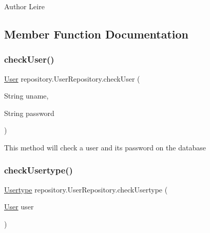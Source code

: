 \begin{DoxyAuthor}{Author}
Leire 
\end{DoxyAuthor}


\subsection{Member Function Documentation}
\mbox{\label{classrepository_1_1_user_repository_adf10692a176bf2819fb70895530ef086}} 
\subsubsection{\texorpdfstring{check\+User()}{checkUser()}}
{\footnotesize\ttfamily \mbox{\hyperlink{classentity_1_1_user}{User}} repository.\+User\+Repository.\+check\+User (\begin{DoxyParamCaption}\item[{String}]{uname,  }\item[{String}]{password }\end{DoxyParamCaption})\hspace{0.3cm}{\ttfamily [inline]}}

This method will check a user and its password on the database \mbox{\label{classrepository_1_1_user_repository_a8e4a797c0eb806d34793295af70fd281}} 
\subsubsection{\texorpdfstring{check\+Usertype()}{checkUsertype()}}
{\footnotesize\ttfamily \mbox{\hyperlink{classentity_1_1_usertype}{Usertype}} repository.\+User\+Repository.\+check\+Usertype (\begin{DoxyParamCaption}\item[{\mbox{\hyperlink{classentity_1_1_user}{User}}}]{user }\end{DoxyParamCaption})\hspace{0.3cm}{\ttfamily [inline]}}


